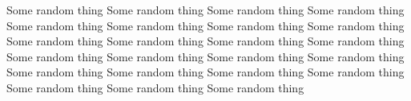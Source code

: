 Some random thing Some random thing Some random thing Some random thing Some random thing Some random thing Some random thing Some random thing Some random thing Some random thing Some random thing Some random thing Some random thing Some random thing Some random thing Some random thing Some random thing Some random thing Some random thing Some random thing Some random thing Some random thing Some random thing  